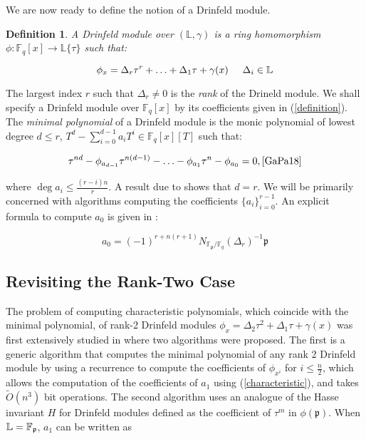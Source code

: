 \documentclass[sigconf]{acmart}
\newtheorem{definition}{Definition}
\newcommand{\F}{\mathbb{F}}
\renewcommand{\L}{\mathbb{L}}
\newcommand{\frakp}{\mathfrak{p}}
\begin{document}
We are now ready to define the notion of a Drinfeld module.

\begin{definition}
A \emph{Drinfeld module} over $(\L, \gamma)$ is a ring homomorphism $\phi: \F_q[x] \to \L\{ \tau \}$ such that:
\end{definition}

\begin{equation}\label{definition}
    \phi_x = \Delta_r \tau^r + \ldots + \Delta_1 \tau + \gamma(x) 
    \hspace{5mm} \Delta_i \in \L
\end{equation}

The largest index $r$ such that $\Delta_r \neq 0$ is the \textit{rank} of the Drineld module. We shall specify a Drinfeld module over $\F_q[x]$ by its coefficients given in (\ref{definition}). The \textit{minimal polynomial} of a Drinfeld module is the monic polynomial of lowest degree $d \leq r$, $T^d - \sum_{i=0}^{d - 1} a_iT^i \in \F_q[x][T]$ such that:

\begin{equation}\label{characteristic}
    \tau^{nd} - \phi_{a_{d-1}}\tau^{n(d-1)} - \ldots - \phi_{a_1} \tau^n - \phi_{a_0} = 0, \cite{GaPa18} 
\end{equation}

where $\deg a_i \leq \frac{(r - i)n}{r}$. A result due to \cite{GaraiPapikian} shows that $d = r$. We will be primarily concerned with algorithms computing the coefficients $\{ a_i \}_{i=0}^{r-1}$. An explicit formula to compute $a_0$ is given in \cite{GaPa18}:

\begin{equation}\label{norm}
    a_0 = (-1)^{r + n(r+1)}N_{\F_{\mathfrak{p}}/\F_q}(\Delta_r)^{-1} \mathfrak{p}
\end{equation}

\subsection{Revisiting the Rank-Two Case}

The problem of computing characteristic polynomials, which coincide with the minimal polynomial, of rank-2 Drinfeld modules $\phi_x = \Delta_2 \tau^2 + \Delta_1 \tau + \gamma(x)$ was first extensively studied in \cite{gekeler} where two algorithms were proposed. The first is a generic algorithm that computes the minimal polynomial of any rank 2 Drinfeld module by using a recurrence to compute the coefficients of $\phi_{x^i}$ for $i \leq \frac{n}{2}$, which allows the computation of the coefficients of $a_1$ using (\ref{characteristic}), and takes $\tilde{O}(n^3)$ bit operations. The second algorithm uses an analogue of the Hasse invariant $H$ for Drinfeld modules defined as the coefficient of $\tau^m$ in $\phi(\frakp)$. When $\L = \F_{\frak{p}}$, $a_1$ can be written as
\end{document}

